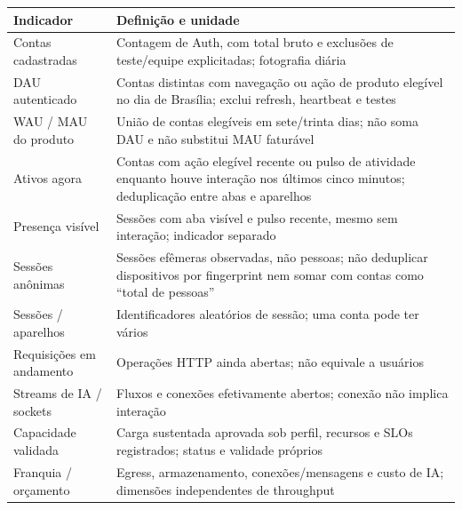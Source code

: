 \documentclass[10pt,a4paper]{article}
\begin{document}
{\def\LTcaptype{none} %
\small
{}
\begin{longtable}[]{@{}
  >{\raggedright\arraybackslash}p{}
  >{\raggedright\arraybackslash}p{}@{}}
\toprule\noalign{}
\rowcolor{NFAccent}
\begin{minipage}[b]{\linewidth}\raggedright
Indicador
\end{minipage} & \begin{minipage}[b]{\linewidth}\raggedright
Definição e unidade
\end{minipage} \\
\midrule\noalign{}
\endhead
\bottomrule\noalign{}
\endlastfoot
Contas cadastradas & Contagem de Auth, com total bruto e exclusões de
teste/equipe explicitadas; fotografia diária \\
DAU autenticado & Contas distintas com navegação ou ação de produto
elegível no dia de Brasília; exclui refresh, heartbeat e testes \\
WAU / MAU do produto & União de contas elegíveis em sete/trinta dias;
não soma DAU e não substitui MAU faturável \\
Ativos agora & Contas com ação elegível recente ou pulso de atividade
enquanto houve interação nos últimos cinco minutos; deduplicação entre
abas e aparelhos \\
Presença visível & Sessões com aba visível e pulso recente, mesmo sem
interação; indicador separado \\
Sessões anônimas & Sessões efêmeras observadas, não pessoas; não
deduplicar dispositivos por fingerprint nem somar com contas como
``total de pessoas'' \\
Sessões / aparelhos & Identificadores aleatórios de sessão; uma conta
pode ter vários \\
Requisições em andamento & Operações HTTP ainda abertas; não equivale a
usuários \\
Streams de IA / sockets & Fluxos e conexões efetivamente abertos;
conexão não implica interação \\
Capacidade validada & Carga sustentada aprovada sob perfil, recursos e
SLOs registrados; status e validade próprios \\
Franquia / orçamento & Egress, armazenamento, conexões/mensagens e custo
de IA; dimensões independentes de throughput \\
\end{longtable}
}
\end{document}
